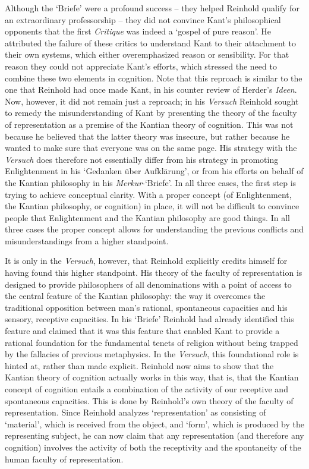  Although the `Briefe' were a profound success {--} they helped Reinhold qualify for an extraordinary professorship {--} they did not convince Kant's philosophical opponents that the first \textit{Critique} was indeed a `gospel of pure reason'. He attributed the failure of these critics to understand Kant to their attachment to their own systems, which either overemphasized reason or sensibility. For that reason they could not appreciate Kant's efforts, which stressed the need to combine these two elements in cognition. Note that this reproach is similar to the one that Reinhold had once made Kant, in his counter review of Herder's \textit{Ideen}. Now, however, it did not remain just a reproach; in his \textit{Versuch} Reinhold sought to remedy the misunderstanding of Kant by presenting the theory of the faculty of representation as a premise of the Kantian theory of cognition. This was not because he believed that the latter theory was insecure, but rather because he wanted to make sure that everyone was on the same page. His strategy with the \textit{Versuch} does therefore not essentially differ from his strategy in promoting Enlightenment in his `Gedanken \"{u}ber Aufkl\"{a}rung', or from his efforts on behalf of the Kantian philosophy in his \textit{Merkur}{-}`Briefe'. In all three cases, the first step is trying to achieve conceptual clarity. With a proper concept (of Enlightenment, the Kantian philosophy, or cognition) in place, it will not be difficult to convince people that Enlightenment and the Kantian philosophy are good things. In all three cases the proper concept allows for understanding the previous conflicts and misunderstandings from a higher standpoint. 

 It is only in the \textit{Versuch}, however, that Reinhold explicitly credits himself for having found this higher standpoint. His theory of the faculty of representation is designed to provide philosophers of all denominations with a point of access to the central feature of the Kantian philosophy: the way it overcomes the traditional opposition between man's rational, spontaneous capacities and his sensory, receptive capacities. In his `Briefe' Reinhold had already identified this feature and claimed that it was this feature that enabled Kant to provide a rational foundation for the fundamental tenets of religion without being trapped by the fallacies of previous metaphysics. In the \textit{Versuch}, this foundational role is hinted at, rather than made explicit. Reinhold now aims to show that the Kantian theory of cognition actually works in this way, that is, that the Kantian concept of cognition entails a combination of the activity of our receptive and spontaneous capacities. This is done by Reinhold's own theory of the faculty of representation. Since Reinhold analyzes `representation' as consisting of `material', which is received from the object, and `form', which is produced by the representing subject, he can now claim that any representation (and therefore any cognition) involves the activity of both the receptivity and the spontaneity of the human faculty of representation. 


